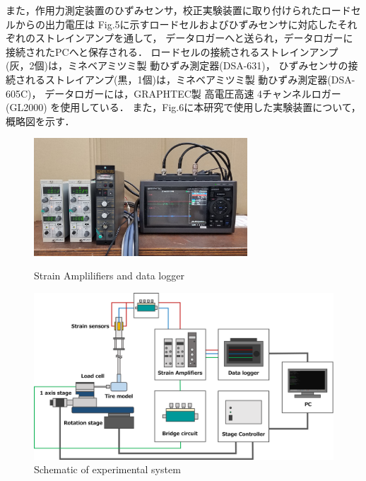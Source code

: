 \newpage

また，作用力測定装置のひずみセンサ，校正実験装置に取り付けられたロードセルからの出力電圧は
Fig.5に示すロードセルおよびひずみセンサに対応したそれぞれのストレインアンプを通して，
データロガーへと送られ，データロガーに接続されたPCへと保存される．
ロードセルの接続されるストレインアンプ(灰，2個)は，ミネベアミツミ製 動ひずみ測定器(DSA-631)，
ひずみセンサの接続されるストレイアンプ(黒，1個)は，ミネベアミツミ製 動ひずみ測定器(DSA-605C)，
データロガーには，GRAPHTEC製 高電圧高速 4チャンネルロガー(GL2000) を使用している．
また，Fig.6に本研究で使用した実験装置について，概略図を示す．

\begin{figure}[htbp]
    \footnotesize
    \begin{center}
        \includegraphics[width=80mm]{images/22-5.png}
        \caption{Strain Amplilifiers and data logger}
        \includegraphics[width=140mm]{images/22-6.png}
        \caption{Schematic of experimental system}
    \end{center}
\end{figure}
